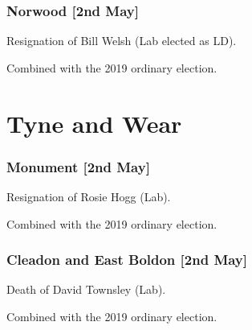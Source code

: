 \begin{resultsiii}

	\subsubsection*{Norwood \hspace*{\fill}\nolinebreak[1]%
		\enspace\hspace*{\fill}
		[2nd May]}


	Resignation of Bill Welsh (Lab elected as LD).

	Combined with the 2019 ordinary election.

	\section{Tyne and Wear}


	\subsubsection*{Monument \hspace*{\fill}\nolinebreak[1]%
		\enspace\hspace*{\fill}
		[2nd May]}


	Resignation of Rosie Hogg (Lab).

	Combined with the 2019 ordinary election.


	\subsubsection*{Cleadon and East Boldon \hspace*{\fill}\nolinebreak[1]%
		\enspace\hspace*{\fill}
		[2nd May]}


	Death of David Townsley (Lab).

	Combined with the 2019 ordinary election.


\end{resultsiii}
